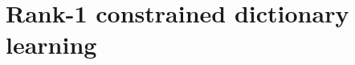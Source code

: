 \documentclass{beamer}
\begin{document}







\section{Rank-1 constrained dictionary learning}
\end{document}
